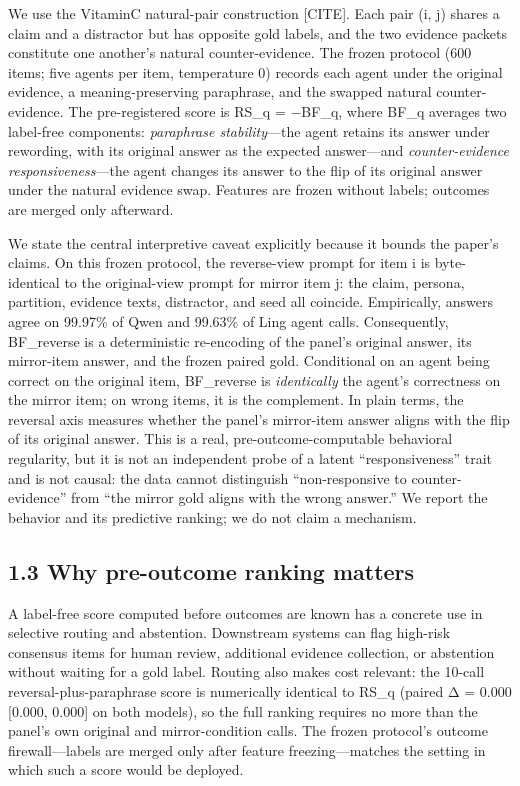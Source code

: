 \documentclass[11pt]{article}
\begin{document}
We use the VitaminC natural-pair construction [CITE]. Each pair (i, j) shares a claim and a distractor but has opposite gold labels, and the two evidence packets constitute one another's natural counter-evidence. The frozen protocol (600 items; five agents per item, temperature 0) records each agent under the original evidence, a meaning-preserving paraphrase, and the swapped natural counter-evidence. The pre-registered score is RS\_q = −BF\_q, where BF\_q averages two label-free components: \emph{paraphrase stability}—the agent retains its answer under rewording, with its original answer as the expected answer—and \emph{counter-evidence responsiveness}—the agent changes its answer to the flip of its original answer under the natural evidence swap. Features are frozen without labels; outcomes are merged only afterward.

We state the central interpretive caveat explicitly because it bounds the paper's claims. On this frozen protocol, the reverse-view prompt for item i is byte-identical to the original-view prompt for mirror item j: the claim, persona, partition, evidence texts, distractor, and seed all coincide. Empirically, answers agree on 99.97\% of Qwen and 99.63\% of Ling agent calls. Consequently, BF\_reverse is a deterministic re-encoding of the panel's original answer, its mirror-item answer, and the frozen paired gold. Conditional on an agent being correct on the original item, BF\_reverse is \emph{identically} the agent's correctness on the mirror item; on wrong items, it is the complement. In plain terms, the reversal axis measures whether the panel's mirror-item answer aligns with the flip of its original answer. This is a real, pre-outcome-computable behavioral regularity, but it is not an independent probe of a latent “responsiveness” trait and is not causal: the data cannot distinguish “non-responsive to counter-evidence” from “the mirror gold aligns with the wrong answer.” We report the behavior and its predictive ranking; we do not claim a mechanism.

\subsection{1.3 Why pre-outcome ranking matters}

A label-free score computed before outcomes are known has a concrete use in selective routing and abstention. Downstream systems can flag high-risk consensus items for human review, additional evidence collection, or abstention without waiting for a gold label. Routing also makes cost relevant: the 10-call reversal-plus-paraphrase score is numerically identical to RS\_q (paired Δ = 0.000 [0.000, 0.000] on both models), so the full ranking requires no more than the panel's own original and mirror-condition calls. The frozen protocol's outcome firewall—labels are merged only after feature freezing—matches the setting in which such a score would be deployed.
\end{document}
